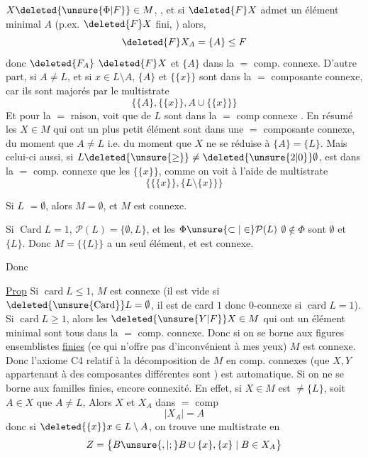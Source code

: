  $X\deleted{\unsure{\Phi|F}}\in M$,  , et si $\deleted{F}X$ admet un  élément minimal $A$ (p.ex. $\deleted{F}X$ fini, ) alors,
\[
\deleted{F}X_A=\{A\}\leq F
\]
 donc $\deleted{F_A}$  $\deleted{F}X$ et $\{A\}$ dans la $=$ comp. connexe. D'autre part,  si $A\ne L$, et si $x\in L\setminus A$, $\{A\}$ et $\{\{x\}\}$ sont dans la $=$ composante connexe, car ils sont majorés par le multistrate
\[
\bigl\{\{A\},\{\{x\}\},A\cup\{\{x\}\}\bigr\}
\]
 Et pour la $=$ raison,    voit que    de $L$ sont dans la $=$ comp connexe . En résumé les $X\in M$ qui ont un plus petit élément  sont dans une $=$ composante connexe, du moment que $A\ne L$ i.e. du moment que $X$ ne se réduise à $\{A\}=\{L\}$. Mais celui-ci aussi, si  $L\deleted{\unsure{\geq}}\ne\deleted{\unsure{2|0}}\emptyset$, est dans la
$=$ comp. connexe que les $\{\{x\}\}$, comme on voit à l'aide de  multistrate
\[
\bigl\{\{\{x\}\},\{L\setminus\{x\}\}\bigr\}
\]

Si $L$  $=\emptyset$,   alors $M=\emptyset$, et $M$ est connexe.

Si $\operatorname{Card}L=1$, $\mathcal P(L)=\{\emptyset,L\}$, et les $\Phi\unsure{\subset|\in}\mathcal P(L)$     $\emptyset\notin\Phi$ sont $\emptyset$ et $\{L\}$. Donc $M=\{\{L\}\}$ a un seul élément, et est connexe.

Donc

\uline{Prop} Si $\operatorname{card}L\leq1$, $M$ est connexe (il est vide si $\deleted{\unsure{\mathrm{Card}}}L=\emptyset$, il est de card $1$ donc $0$-connexe si $\operatorname{card}L=1$). Si $\operatorname{card}L\geq1$, alors les $\deleted{\unsure{Y|F}}X\in M$ qui ont un élément minimal sont tous dans la $=$ comp. connexe. Donc si on se borne aux  figures ensemblistes \uline{finies} (ce qui n'offre pas d'inconvénient à mes yeux) $M$ est connexe. Donc l'axiome C4  relatif à la décomposition de $M$ en comp. connexes (que $X,Y$ appartenant à des composantes différentes sont ) est automatique.
Si on ne se borne aux familles finies,  encore connexité. En effet, si $X\in M$ est $\ne\{L\}$, soit $A\in X$  que $A\ne L$, Alors $X$ et $X_A$ dans $=$ comp 
\[
\lvert X_A\rvert=A
\]
donc si $\deleted{\{x\}}x\in L\setminus A$, on trouve une multistrate en 
\[
Z=\bigl\{B\unsure{,|;}B\cup\{x\},\{x\}\mid B\in X_A\bigr\}
\]
\margin{\unsure{,}}

